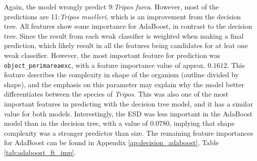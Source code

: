 Again, the model wrongly predict 9:\textit{Tripos furca}. However, most of the predictions are 11:\textit{Tripos muelleri}, which is an improvement from the decision tree. All features show some importance for AdaBoost, in contrast to the decision tree. Since the result from each weak classifier is weighted when making a final prediction, which likely result in all the features being candidates for at leat one weak classifier. However, the most important feature for prediction was \verb|object_perimareaexc|, with a feature importance value of approx. $0.1612$. This feature describes the complexity in shape of the organism (outline divided by shape), and the emphasis on this parameter may explain why the model better differentiates between the species of \textit{Tripos}. This was also one of the most important features in predicting with the decision tree model, and it has a similar value for both models. Interestingly, the ESD was less important in the AdaBoost model than in the decision tree, with a value of $0.0780$, implying that shape complexity was a stronger predictor than size. The remaining feature importances for AdaBoost can be found in Appendix \ref{ap:decision_adaboost}, Table \ref{tab:adaboost_ft_imp}. 

